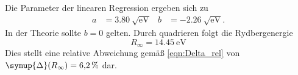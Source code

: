 Die Parameter der linearen Regression ergeben sich zu 
\begin{align*}
  a &= \qty{3.80}{\sqrt{\unit{\electronvolt}}} & b &= \qty{-2.26}{\sqrt{\unit{\electronvolt}}}.
\end{align*}
In der Theorie sollte $b = 0$ gelten. 
Durch quadrieren folgt die Rydbergenergie
\begin{equation*}
  R_\infty = \qty{14.45}{\electronvolt}
\end{equation*}
Dies stellt eine relative Abweichung gemäß \autoref{eqn:Delta_rel} von $\symup{\Delta}(R_\infty) = \qty{6.2}{\percent}$ dar.
